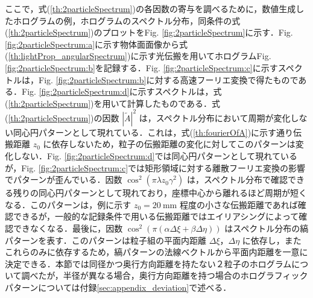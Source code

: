 ここで，式(\ref{th:2particleSpectrum})の各因数の寄与を調べるために，数値生成したホログラムの例，ホログラムのスペクトル分布，同条件の式(\ref{th:2particleSpectrum})のプロットをFig. \ref{fig:2particleSpectrum}に示す．Fig. \ref{fig:2particleSpectrum:a}に示す物体面面像から式(\ref{th:lightProp_angularSpectrum})に示す光伝搬を用いてホログラムFig. \ref{fig:2particleSpectrum:b}を記録する．Fig. \ref{fig:2particleSpectrum:c}に示すスペクトルは，Fig. \ref{fig:2particleSpectrum:b}に対する高速フーリエ変換で得たものである．Fig. \ref{fig:2particleSpectrum:d}に示すスペクトルは，式(\ref{th:2particleSpectrum})を用いて計算したものである．式(\ref{th:2particleSpectrum})の因数 $\left| \tilde{A} \right|^2$ は，スペクトル分布において周期が変化しない同心円パターンとして現れている．これは，式(\ref{th:fourierOfA})に示す通り伝搬距離 $z_0$ に依存しないため，粒子の伝搬距離の変化に対してこのパターンは変化しない．Fig. \ref{fig:2particleSpectrum:d}では同心円パターンとして現れているが，Fig. \ref{fig:2particleSpectrum:c}では矩形領域に対する離散フーリエ変換の影響でパターンが歪んでいる．因数 $\cos^2{\left( \pi \lambda z_0 \gamma^2 \right)}$ は，スペクトル分布で確認できる残りの同心円パターンとして現れており，座標中心から離れるほど周期が短くなる．このパターンは，例に示す $z_0 = \SI{20}{\mm}$ 程度の小さな伝搬距離であれば確認できるが，一般的な記録条件で用いる伝搬距離ではエイリアシングによって確認できなくなる．最後に，因数 $\cos^2{\left( \pi \left( \alpha \Delta \xi + \beta \Delta \eta \right) \right)}$ はスペクトル分布の縞パターンを表す．このパターンは粒子組の平面内距離 $\Delta \xi$，$\Delta \eta$ に依存し，またこれらのみに依存するため，縞パターンの法線ベクトルから平面内距離を一意に決定できる．本節では同径かつ奥行方向距離を持たない２粒子のホログラムについて調べたが，半径が異なる場合，奥行方向距離を持つ場合のホログラフィックパターンについては付録\ref{sec:appendix_deviation}で述べる．

